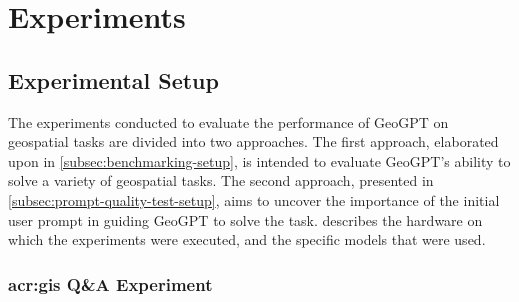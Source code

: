 \chapter{Experiments}
\label{cha:experiments}

\section{Experimental Setup}
\label{sec:experimental-setup}

\begin{comment}
Trying and failing is a major part of research. However, to have a chance of success you need a plan driving the experimental research, just as you need a plan for your literature search. Further, plans are made to be revised and this revision ensures that any further decisions made are in line with the work already completed.

The plan should include what experiments or series of experiments are planned and what questions the individual or set of experiments aim to answer. Such questions should be connected to your research questions, so that in the evaluation of your results you can discuss the results wrt to the research questions.
\end{comment}

\begin{comment}
The experimental setup should include all data --- parameters, etc. --- that would allow a person to repeat your experiments.
This will thus be the actual instantiation for each experiment of the general architecture described in Chapter~\ref{cha:architecture}.
\end{comment}

The experiments conducted to evaluate the performance of GeoGPT on geospatial tasks are divided into two approaches. The first approach, elaborated upon in \autoref{subsec:benchmarking-setup}, is intended to evaluate GeoGPT's ability to solve a variety of geospatial tasks. The second approach, presented in \autoref{subsec:prompt-quality-test-setup}, aims to uncover the importance of the initial user prompt in guiding GeoGPT to solve the task.  describes the hardware on which the experiments were executed, and the specific models that were used.

\subsection[GIS Q\&A Experiment]{\acrshort{acr:gis} Q\&A Experiment}
\label{subsec:benchmarking-setup}

